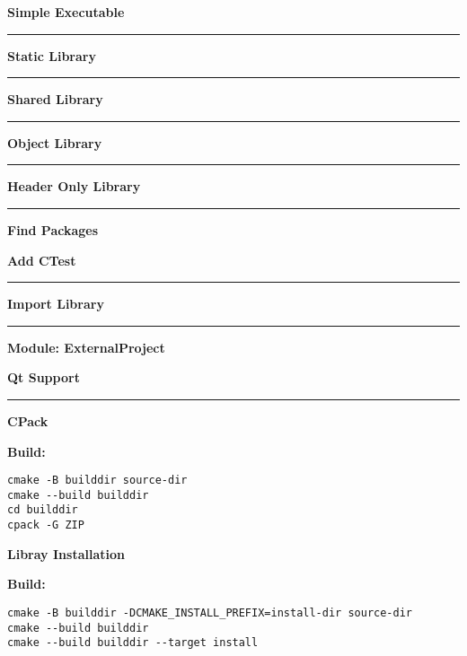\documentclass{article}
\begin{document}
\begin{minipage}[t]{0.20\linewidth}
\textbf{Simple Executable}

\noindent\rule{\textwidth}{0.1pt}
\textbf{Static Library}

\noindent\rule{\textwidth}{0.1pt}
\textbf{Shared Library}

\noindent\rule{\textwidth}{0.1pt}
\textbf{Object Library}

\noindent\rule{\textwidth}{0.1pt}
\textbf{Header Only Library}

\noindent\rule{\textwidth}{0.1pt}
\textbf{Find Packages}

\end{minipage}
\hfill\vline\hfill
\begin{minipage}[t]{0.26\linewidth}
\textbf{Add CTest}

\noindent\rule{\textwidth}{0.1pt}
\textbf{Import Library}

\noindent\rule{\textwidth}{0.1pt}
\textbf{Module: ExternalProject}

\end{minipage}
\hfill\vline\hfill
\begin{minipage}[t]{0.20\linewidth}
\textbf{Qt Support}

\noindent\rule{\textwidth}{0.1pt}
\textbf{CPack}

\textbf{Build:}
\begin{verbatim}
cmake -B builddir source-dir
cmake --build builddir
cd builddir
cpack -G ZIP
\end{verbatim}
\end{minipage}
\hfill\vline\hfill
\begin{minipage}[t]{0.25\linewidth}
\textbf{Libray Installation}

\textbf{Build:}
\begin{verbatim}
cmake -B builddir -DCMAKE_INSTALL_PREFIX=install-dir source-dir
cmake --build builddir
cmake --build builddir --target install
\end{verbatim}
\end{minipage}
\end{document}
